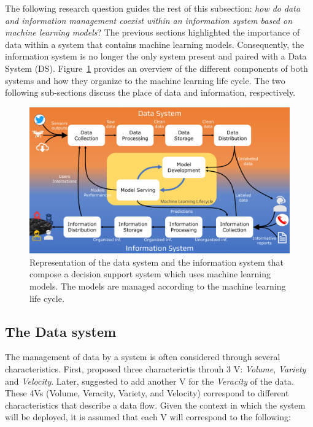 The following research question guides the rest of this subsection: \textit{how do data and information management coexist within an information system based on machine learning models}?
The previous sections highlighted the importance of data within a system that contains machine learning models.
Consequently, the information system is no longer the only system present and paired with a Data System (DS).
Figure~\ref{system:ds-is-systems} provides an overview of the different components of both systems and how they organize to the machine learning life cycle.
The two following sub-sections discuss the place of data and information, respectively.

\begin{figure}[htb]
    \centering
    \includegraphics[width=\textwidth]{figures/chap-5/data-information-systems.pdf}
    \caption{Representation of the data system and the information system that compose a decision support system which uses machine learning models. The models are managed according to the machine learning life cycle.}
    \label{system:ds-is-systems}
\end{figure}

\subsection{The Data system}
The management of data by a system is often considered through several characteristics.
First, \textcite{laney3DDataManagement2001} proposed three characterictis throuh 3 V: \emph{Volume}, \emph{Variety} and \emph{Velocity}.
Later, \parencite{kalyvasBigDataPrimer2014} suggested to add another V for the \emph{Veracity} of the data.
These 4Vs (Volume, Veracity, Variety, and Velocity) correspond to different characteristics that describe a data flow.
Given the context in which the system will be deployed, it is assumed that each V will correspond to the following:

